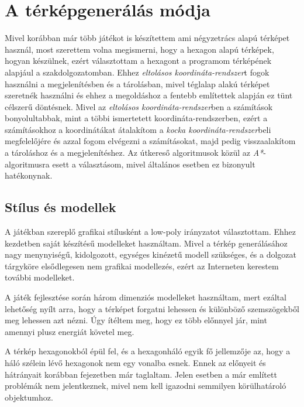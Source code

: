 \chapter{A térképgenerálás módja}
\label{chap:tervezes}

Mivel korábban már több játékot is készítettem ami négyzetrács alapú térképet használ, most szerettem volna megismerni, hogy a hexagon alapú térképek, hogyan készülnek, ezért választottam a hexagont a programom térképének alapjául a szakdolgozatomban. Ehhez \textit{eltolásos koordináta-rendszer}t fogok használni a megjelenítésben és a tárolásban, mivel téglalap alakú térképet szeretnék használni és ehhez a megoldáshoz a fentebb említettek alapján ez tünt célszerű döntésnek. Mivel az \textit{eltolásos koordináta-rendszer}ben a számítások bonyolultabbak, mint a többi ismertetett koordináta-rendszerben, ezért a számításokhoz a koordinátákat átalakítom a \textit{kocka koordináta-rendszer}beli megfelelőjére és azzal fogom elvégezni a számításokat, majd pedig visszaalakítom a tároláshoz és a megjelenítéshez. Az útkereső algoritmusok közül az \textit{A*}-algoritmusra esett a választásom, mivel általános esetben ez bizonyult hatékonynak.

\section{Stílus és modellek}
\cite{Unity}
\cite{hegyek}
\cite{buildings}
\cite{trees}
\cite{flowers}
\cite{cactus}

A játékban szereplő grafikai stílusként a low-poly irányzatot választottam. Ehhez kezdetben saját készítésű modelleket használtam. Mivel a térkép generálásához nagy meny\-nyi\-sé\-gű, kidolgozott, egységes kinézetű modell szükséges, és a dolgozat tárgyköre elsődlegesen nem grafikai modellezés, ezért az Interneten kerestem további modelleket.

A játék fejlesztése során három dimenziós modelleket használtam, mert ezáltal lehetőség nyílt arra, hogy a térképet forgatni lehessen és különböző szemszögekből meg lehessen azt nézni. Úgy ítéltem meg, hogy ez több előnnyel jár, mint amennyi plusz energiát követel meg.

A térkép hexagonokból épül fel, és a hexagonháló egyik fő jellemzője az, hogy a háló szélein lévő hexagonok nem egy vonalba esnek. Ennek az előnyeit és hátrányait korábban  fejezetben már taglaltam. Jelen esetben a már említett problémák nem jelentkeznek, mivel nem kell igazodni semmilyen körülhatároló objektumhoz.

